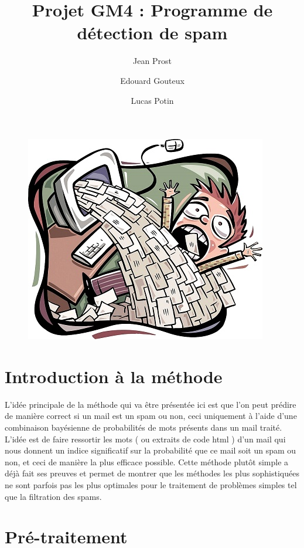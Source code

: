 \documentclass{article}
\title{Projet GM4 : Programme de détection de spam}
\author{Jean Prost \and Edouard Gouteux \and Lucas Potin}
\begin{document}
\maketitle
\begin{center}
\begin{figure}[h]
\includegraphics[scale=0.9]{email-spam.jpg}
\end{figure}
\end{center}
\clearpage
\renewcommand{\contentsname}{Sommaire} 
\tableofcontents
\clearpage
 
\section{Introduction à la méthode}

L'idée principale de la méthode qui va être présentée ici est que l'on peut prédire de manière correct si un mail est un spam ou non, ceci uniquement à l'aide d'une combinaison bayésienne de probabilités de mots présents dans un mail traité. L'idée est de faire ressortir les mots ( ou extraits de code html ) d'un mail qui nous donnent un indice significatif sur la probabilité que ce mail soit un spam ou non, et ceci de manière la plus efficace possible. Cette méthode plutôt simple a déjà fait ses preuves et permet de montrer que les méthodes les plus sophistiquées ne sont parfois pas les plus optimales pour le traitement de problèmes simples tel que la filtration des spams.

\section{Pré-traitement}
\end{document}
